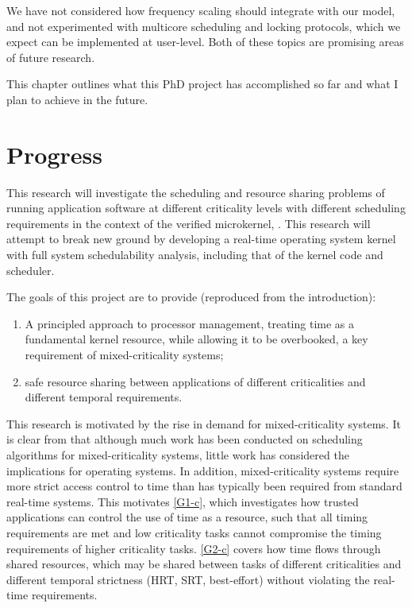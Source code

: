 We have not considered how frequency scaling should integrate with our model, and not experimented
with multicore scheduling and locking protocols, which we expect can be implemented at user-level.
Both of these topics are promising areas of future research.



This chapter outlines what this PhD project has accomplished so far and what I plan to achieve in the future.

\section{Progress}

This research will investigate the scheduling and resource sharing problems of running application software at different criticality levels with different scheduling requirements in the context of the verified microkernel, \selfour.
This research will attempt to break new ground by developing a real-time operating system kernel with full system schedulability analysis, including that of the kernel code and scheduler.

The goals of this project are to provide (reproduced from the introduction):

\begin{enumerate}[label=\textbf{G\arabic*}]
  \item \label{G1-c} A principled approach to processor management, treating time as a fundamental kernel resource, while allowing it to be overbooked, a key requirement of mixed-criticality systems;
  \item \label{G2-c} safe resource sharing between applications of different criticalities and different temporal requirements.
\end{enumerate}

This research is motivated by the rise in demand for mixed-criticality systems.
It is clear from  that although much work has been conducted on scheduling algorithms for mixed-criticality systems, little work has considered the implications for operating systems.
In addition, mixed-criticality systems require more strict access control to time than has typically been required from standard real-time systems.
This motivates \ref{G1-c}, which investigates how trusted applications can control the use of time as a resource, such that all timing requirements are met and low criticality tasks cannot compromise the timing requirements of higher criticality tasks.
\ref{G2-c} covers how time flows through shared resources, which may be shared between tasks of
different criticalities and different temporal strictness (\gls{HRT}, \gls{SRT}, best-effort) without violating the real-time requirements.

